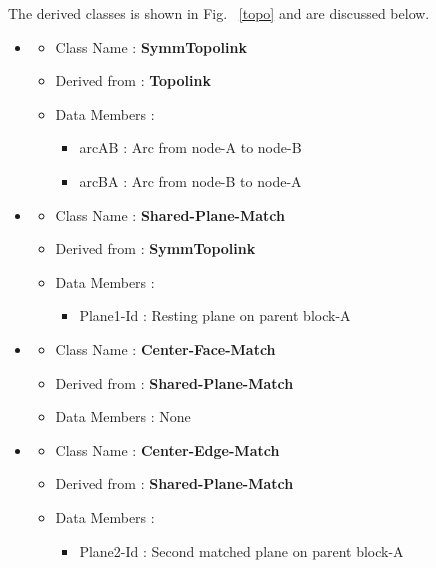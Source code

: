 	The derived classes is shown in Fig. ~\ref{topo} and are discussed below.
	\begin{itemize}

	\item
        \begin{itemize}
        \item   Class Name :	{\bf SymmTopolink}
        \item   Derived from :	{\bf Topolink}
        \item   Data Members :
                    \begin{itemize}
					\item	arcAB :	Arc from node-A to node-B
					\item	arcBA :	Arc from node-B to node-A
                    \end{itemize}
        \end{itemize}

    \item

        \begin{itemize}
        \item   Class Name :	{\bf Shared-Plane-Match}
        \item   Derived from :	{\bf SymmTopolink}
        \item   Data Members :
                    \begin{itemize}
					\item	Plane1-Id :	 Resting plane on parent block-A
                    \end{itemize}
        \end{itemize}


    \item

        \begin{itemize}
        \item   Class Name :	{\bf Center-Face-Match}
        \item   Derived from :	{\bf Shared-Plane-Match}
        \item   Data Members :	None
        \end{itemize}


    \item

        \begin{itemize}
        \item   Class Name :	{\bf Center-Edge-Match}
        \item   Derived from :	{\bf Shared-Plane-Match}
        \item   Data Members :
                    \begin{itemize}
					\item	Plane2-Id :	  Second matched plane on parent block-A
                    \end{itemize}
        \end{itemize}



\end{itemize}
